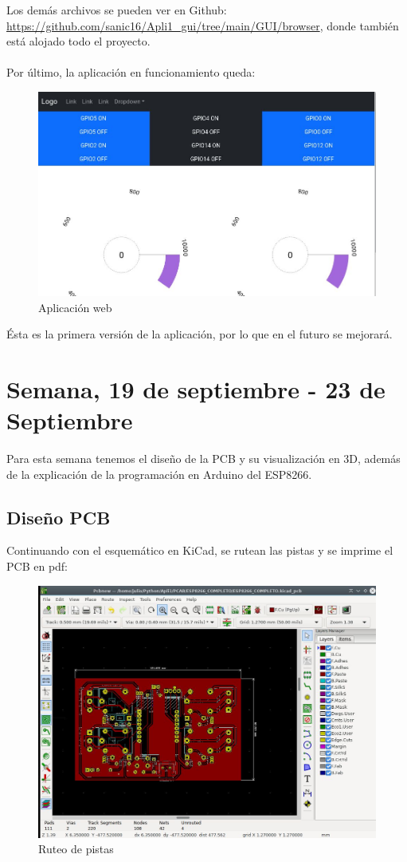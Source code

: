 \documentclass[oneside]{article}
\begin{document}
Los demás archivos se pueden ver en 
Github: \url{https://github.com/sanic16/Apli1_gui/tree/main/GUI/browser}, donde también está alojado todo el proyecto.
\\\\
Por último, la aplicación en funcionamiento queda:
\begin{figure}[H]
\centering
\includegraphics[scale=0.75]{images/app.jpg}
\caption{Aplicación web}
\end{figure}

Ésta es la primera versión de la aplicación, por lo que en el futuro se mejorará.

\section*{Semana, 19 de septiembre - 23 de Septiembre}
Para esta semana tenemos el diseño de la PCB y su visualización en 3D, además de la explicación de la programación en Arduino del ESP8266.

\subsection*{Diseño PCB}
Continuando con el esquemático en KiCad, se rutean las pistas y se imprime el PCB en pdf:

\begin{figure}[H]
\centering
\includegraphics[scale=0.65]{images/ruteo_pistas.jpg}
\caption{Ruteo de pistas}
\end{figure}
\end{document}
